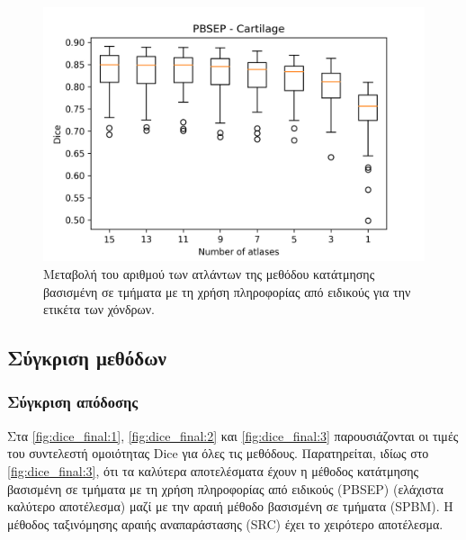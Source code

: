 \documentclass[a4paper,12pt]{article}
\begin{document}
\begin{figure}[H]
    \centering
    \includegraphics[width=0.85\linewidth]{PBSEP_Number_of_atlases_Cartilage_plot.png}
    \caption{Μεταβολή του αριθμού των ατλάντων της μεθόδου κατάτμησης βασισμένη
             σε τμήματα με τη χρήση πληροφορίας από ειδικούς για την ετικέτα των
             χόνδρων.}
    \label{fig:PBSEP:atlases:3}
\end{figure}


\subsection{Σύγκριση μεθόδων}

\subsubsection{Σύγκριση απόδοσης}

Στα \autoref{fig:dice_final:1}, \autoref{fig:dice_final:2} και
\autoref{fig:dice_final:3} παρουσιάζονται οι τιμές του συντελεστή ομοιότητας
Dice για όλες τις μεθόδους. Παρατηρείται, ιδίως στο \autoref{fig:dice_final:3},
ότι τα καλύτερα αποτελέσματα έχουν η μέθοδος κατάτμησης βασισμένη σε τμήματα με
τη χρήση πληροφορίας από ειδικούς (PBSEP) (ελάχιστα καλύτερο αποτέλεσμα) μαζί με
την αραιή μέθοδο βασισμένη σε τμήματα (SPBM). Η μέθοδος ταξινόμησης αραιής
αναπαράστασης (SRC) έχει το χειρότερο αποτέλεσμα.

\end{document}
